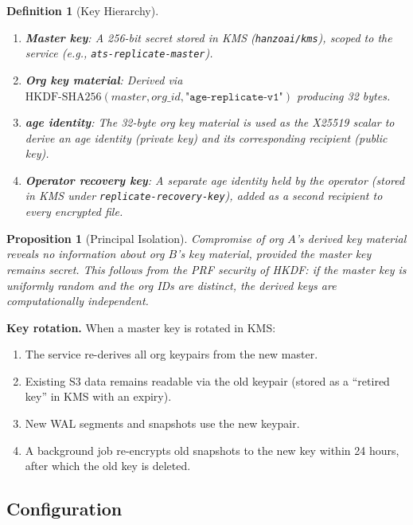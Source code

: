 \documentclass[11pt,a4paper]{article}
\newtheorem{definition}{Definition}[section]
\newtheorem{proposition}[theorem]{Proposition}
\begin{document}
\begin{definition}[Key Hierarchy]\label{def:keyhier}
\begin{enumerate}[nosep]
  \item \textbf{Master key}: A 256-bit secret stored in KMS
    (\texttt{hanzoai/kms}), scoped to the service (e.g.,
    \texttt{ats-replicate-master}).
  \item \textbf{Org key material}: Derived via
    $\mathrm{HKDF\text{-}SHA256}(\mathit{master}, \mathit{org\_id}, \texttt{"age-replicate-v1"})$
    producing 32 bytes.
  \item \textbf{age identity}: The 32-byte org key material is used
    as the X25519 scalar to derive an age identity (private key) and
    its corresponding recipient (public key).
  \item \textbf{Operator recovery key}: A separate age identity held
    by the operator (stored in KMS under
    \texttt{replicate-recovery-key}), added as a second recipient to
    every encrypted file.
\end{enumerate}
\end{definition}

\begin{proposition}[Principal Isolation]\label{prop:isolation}
Compromise of org $A$'s derived key material reveals no information
about org $B$'s key material, provided the master key remains secret.
This follows from the PRF security of HKDF: if the master key is
uniformly random and the org IDs are distinct, the derived keys are
computationally independent.
\end{proposition}

\noindent\textbf{Key rotation.} When a master key is rotated in KMS:

\begin{enumerate}[nosep]
  \item The service re-derives all org keypairs from the new master.
  \item Existing S3 data remains readable via the old keypair (stored
    as a ``retired key'' in KMS with an expiry).
  \item New WAL segments and snapshots use the new keypair.
  \item A background job re-encrypts old snapshots to the new key
    within 24 hours, after which the old key is deleted.
\end{enumerate}

\subsection{Configuration}\label{sec:config}
\end{document}
